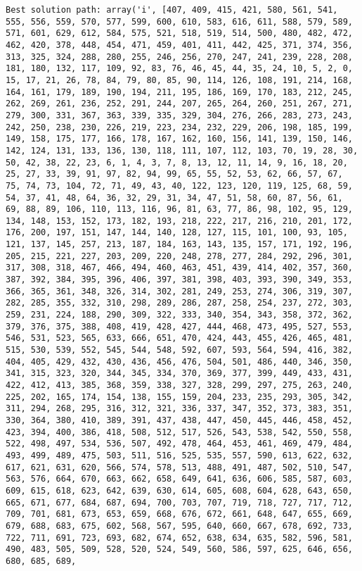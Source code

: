 \documentclass[11pt]{article}
\begin{document}
\begin{Verbatim}[commandchars=\\\{\}]
Best solution path: array('i', [407, 409, 415, 421, 580, 561, 541, 555, 556, 559, 570, 577, 599, 600, 610, 583, 616, 611, 588, 579, 589, 571, 601, 629, 612, 584, 575, 521, 518, 519, 514, 500, 480, 482, 472, 462, 420, 378, 448, 454, 471, 459, 401, 411, 442, 425, 371, 374, 356, 313, 325, 324, 288, 280, 255, 246, 256, 270, 247, 241, 239, 228, 208, 181, 180, 132, 117, 109, 92, 83, 76, 46, 45, 44, 35, 24, 10, 5, 2, 0, 15, 17, 21, 26, 78, 84, 79, 80, 85, 90, 114, 126, 108, 191, 214, 168, 164, 161, 179, 189, 190, 194, 211, 195, 186, 169, 170, 183, 212, 245, 262, 269, 261, 236, 252, 291, 244, 207, 265, 264, 260, 251, 267, 271, 279, 300, 331, 367, 363, 339, 335, 329, 304, 276, 266, 283, 273, 243, 242, 250, 238, 230, 226, 219, 223, 234, 232, 229, 206, 198, 185, 199, 149, 158, 175, 177, 166, 178, 167, 162, 160, 156, 141, 139, 150, 146, 142, 124, 131, 133, 136, 130, 118, 111, 107, 112, 103, 70, 19, 28, 30, 50, 42, 38, 22, 23, 6, 1, 4, 3, 7, 8, 13, 12, 11, 14, 9, 16, 18, 20, 25, 27, 33, 39, 91, 97, 82, 94, 99, 65, 55, 52, 53, 62, 66, 57, 67, 75, 74, 73, 104, 72, 71, 49, 43, 40, 122, 123, 120, 119, 125, 68, 59, 54, 37, 41, 48, 64, 36, 32, 29, 31, 34, 47, 51, 58, 60, 87, 56, 61, 69, 88, 89, 106, 110, 113, 116, 96, 81, 63, 77, 86, 98, 102, 95, 129, 134, 148, 153, 152, 173, 182, 193, 218, 222, 217, 216, 210, 201, 172, 176, 200, 197, 151, 147, 144, 140, 128, 127, 115, 101, 100, 93, 105, 121, 137, 145, 257, 213, 187, 184, 163, 143, 135, 157, 171, 192, 196, 205, 215, 221, 227, 203, 209, 220, 248, 278, 277, 284, 292, 296, 301, 317, 308, 318, 467, 466, 494, 460, 463, 451, 439, 414, 402, 357, 360, 387, 392, 384, 395, 396, 406, 397, 381, 398, 403, 393, 390, 349, 353, 366, 365, 361, 348, 326, 314, 302, 281, 249, 253, 274, 306, 319, 307, 282, 285, 355, 332, 310, 298, 289, 286, 287, 258, 254, 237, 272, 303, 259, 231, 224, 188, 290, 309, 322, 333, 340, 354, 343, 358, 372, 362, 379, 376, 375, 388, 408, 419, 428, 427, 444, 468, 473, 495, 527, 553, 546, 531, 523, 565, 633, 666, 651, 470, 424, 443, 455, 426, 465, 481, 515, 530, 539, 552, 545, 544, 548, 592, 607, 593, 564, 594, 416, 382, 404, 405, 429, 432, 430, 436, 456, 476, 504, 501, 486, 440, 346, 350, 341, 315, 323, 320, 344, 345, 334, 370, 369, 377, 399, 449, 433, 431, 422, 412, 413, 385, 368, 359, 338, 327, 328, 299, 297, 275, 263, 240, 225, 202, 165, 174, 154, 138, 155, 159, 204, 233, 235, 293, 305, 342, 311, 294, 268, 295, 316, 312, 321, 336, 337, 347, 352, 373, 383, 351, 330, 364, 380, 410, 389, 391, 437, 438, 447, 450, 445, 446, 458, 452, 423, 394, 400, 386, 418, 508, 512, 517, 526, 543, 538, 542, 550, 558, 522, 498, 497, 534, 536, 507, 492, 478, 464, 453, 461, 469, 479, 484, 493, 499, 489, 475, 503, 511, 516, 525, 535, 557, 590, 613, 622, 632, 617, 621, 631, 620, 566, 574, 578, 513, 488, 491, 487, 502, 510, 547, 563, 576, 664, 670, 663, 662, 658, 649, 641, 636, 606, 585, 587, 603, 609, 615, 618, 623, 642, 639, 630, 614, 605, 608, 604, 628, 643, 650, 665, 671, 677, 684, 687, 694, 700, 703, 707, 719, 718, 727, 717, 712, 709, 701, 681, 673, 653, 659, 668, 676, 672, 661, 648, 647, 655, 669, 679, 688, 683, 675, 602, 568, 567, 595, 640, 660, 667, 678, 692, 733, 722, 711, 691, 723, 693, 682, 674, 652, 638, 634, 635, 582, 596, 581, 490, 483, 505, 509, 528, 520, 524, 549, 560, 586, 597, 625, 646, 656, 680, 685, 689, 
\end{Verbatim}
\end{document}
